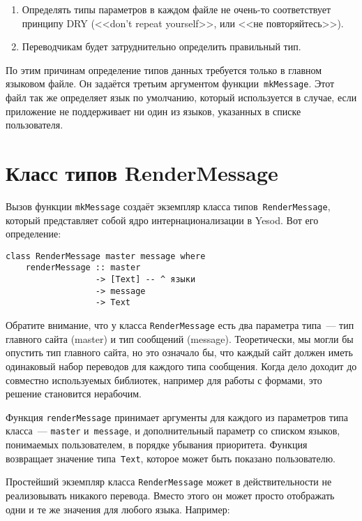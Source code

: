 \begin{enumerate}
  \item Определять типы параметров в каждом файле не очень-то соответствует
      принципу DRY (<<don't repeat yourself>>, или <<не повторяйтесь>>).

  \item Переводчикам будет затруднительно определить правильный тип.
\end{enumerate}

По этим причинам определение типов данных требуется только в главном языковом
файле. Он задаётся третьим аргументом функции~\lstinline'mkMessage'. Этот файл
так же определяет язык по умолчанию, который используется в случае, если
приложение не поддерживает ни один из языков, указанных в списке пользователя.

\section{Класс типов RenderMessage}

Вызов функции \lstinline'mkMessage' создаёт экземпляр класса
типов~\lstinline'RenderMessage', который представляет собой ядро
интернационализации в Yesod. Вот его определение:

\begin{lstlisting}
class RenderMessage master message where
    renderMessage :: master
                  -> [Text] -- ^ языки
                  -> message
                  -> Text
\end{lstlisting}

Обратите внимание, что у класса \lstinline'RenderMessage' есть два параметра
типа~--- тип главного сайта (master) и тип сообщений (message). Теоретически,
мы могли бы опустить тип главного сайта, но это означало бы, что каждый сайт
должен иметь одинаковый набор переводов для каждого типа сообщения. Когда дело
доходит до совместно используемых библиотек, например для работы с формами,
это решение становится нерабочим.

Функция \lstinline'renderMessage' принимает аргументы для каждого из параметров
типа класса~--- \lstinline'master' и~\lstinline'message', и дополнительный
параметр со списком языков, понимаемых пользователем, в порядке убывания
приоритета. Функция возвращает значение типа~\lstinline'Text', которое может
быть показано пользователю.

Простейший экземпляр класса \lstinline'RenderMessage' может в действительности
не реализовывать никакого перевода. Вместо этого он может просто отображать
одни и те же значения для любого языка. Например:

